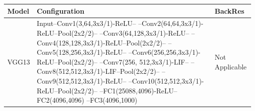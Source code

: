 \begin{tabular}{lll}
\toprule
Model & Configuration & BackRes \\
\midrule
VGG13 & Input–Conv1(3,64,3x3/1)-ReLU– –Conv2(64,64,3x3/1)-ReLU–Pool(2x2/2)– –Conv3(64,128,3x3/1)-ReLU– –Conv4(128,128,3x3/1)-ReLU–Pool(2x2/2)– –Conv5(128,256,3x3/1)-ReLU– –Conv6(256,256,3x3/1)-ReLU–Pool(2x2/2)– –Conv7(256, 512,3x3/1)-LIF– –Conv8(512,512,3x3/1)-LIF–Pool(2x2/2)– –Conv9(512,512,3x3/1)-ReLU– –Conv10(512,512,3x3/1)-ReLU–Pool(2x2/2)– –FC1(25088,4096)-ReLU–FC2(4096,4096) –FC3(4096,1000) & Not Applicable \\
\bottomrule
\end{tabular}
